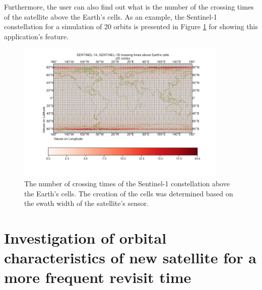 Furthermore, the user can also find out what is the number of the crossing times of the satellite above the Earth's cells. As an example, the Sentinel-1 constellation for a simulation of 20 orbits is presented in Figure \ref{SENTINEL-1A_SENTINEL-1B_crossing_times.png} for showing this application's feature.

\begin{figure}
\centering
\includegraphics[width=0.9\textwidth]{Images/SENTINEL-1A_SENTINEL-1B_crossing_times.png}
\caption{The number of crossing times of the Sentinel-1 constellation above the Earth's cells. The creation of the cells was determined based on the swath width of the satellite's sensor.}
\label{SENTINEL-1A_SENTINEL-1B_crossing_times.png}
\end{figure}


\bigskip
\section{Investigation of orbital characteristics of new satellite for a more frequent revisit time}
\bigskip

